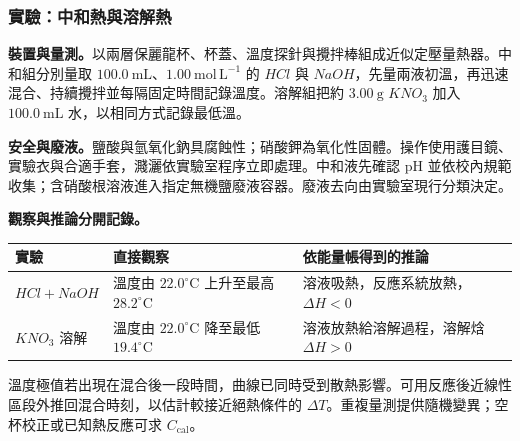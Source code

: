 \documentclass[11pt,a4paper]{article}
\newcounter{none}
\begin{document}
\subsubsection{實驗：中和熱與溶解熱}\label{ux5be6ux9a57ux4e2dux548cux71b1ux8207ux6eb6ux89e3ux71b1}

\textbf{裝置與量測。}以兩層保麗龍杯、杯蓋、溫度探針與攪拌棒組成近似定壓量熱器。中和組分別量取 \(100.0\ \mathrm{mL}\)、\(1.00\ \mathrm{mol\,L^{-1}}\) 的 \(HCl\) 與 \(NaOH\)，先量兩液初溫，再迅速混合、持續攪拌並每隔固定時間記錄溫度。溶解組把約 \(3.00\ \mathrm g\) \(KNO_3\) 加入 \(100.0\ \mathrm{mL}\) 水，以相同方式記錄最低溫。

\textbf{安全與廢液。}鹽酸與氫氧化鈉具腐蝕性；硝酸鉀為氧化性固體。操作使用護目鏡、實驗衣與合適手套，濺灑依實驗室程序立即處理。中和液先確認 pH 並依校內規範收集；含硝酸根溶液進入指定無機鹽廢液容器。廢液去向由實驗室現行分類決定。

\textbf{觀察與推論分開記錄。}

{\def\LTcaptype{none} %
\begin{longtable}[]{@{}
  >{\raggedright\arraybackslash}p{}
  >{\raggedright\arraybackslash}p{}
  >{\raggedright\arraybackslash}p{}@{}}
\toprule\noalign{}
\begin{minipage}[b]{\linewidth}\raggedright
實驗
\end{minipage} & \begin{minipage}[b]{\linewidth}\raggedright
直接觀察
\end{minipage} & \begin{minipage}[b]{\linewidth}\raggedright
依能量帳得到的推論
\end{minipage} \\
\midrule\noalign{}
\endhead
\bottomrule\noalign{}
\endlastfoot
\(HCl+NaOH\) & 溫度由 \(22.0^\circ\mathrm C\) 上升至最高 \(28.2^\circ\mathrm C\) & 溶液吸熱，反應系統放熱，\(\Delta H<0\) \\
\(KNO_3\) 溶解 & 溫度由 \(22.0^\circ\mathrm C\) 降至最低 \(19.4^\circ\mathrm C\) & 溶液放熱給溶解過程，溶解焓 \(\Delta H>0\) \\
\end{longtable}
}

溫度極值若出現在混合後一段時間，曲線已同時受到散熱影響。可用反應後近線性區段外推回混合時刻，以估計較接近絕熱條件的 \(\Delta T\)。重複量測提供隨機變異；空杯校正或已知熱反應可求 \(C_{\text{cal}}\)。
\end{document}
